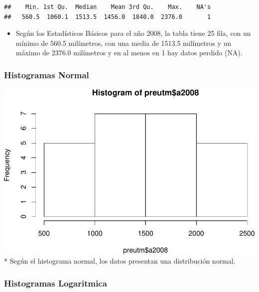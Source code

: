 \documentclass[11pt,]{article}
\newenvironment{Shaded}{\begin{snugshade}}{\end{snugshade}}
\newcommand{\KeywordTok}[1]{\textcolor[rgb]{0.13,0.29,0.53}{\textbf{#1}}}
\newcommand{\OperatorTok}[1]{\textcolor[rgb]{0.81,0.36,0.00}{\textbf{#1}}}
\newcommand{\NormalTok}[1]{#1}
\providecommand{\tightlist}{%
\setlength{\itemsep}{0pt}\setlength{\parskip}{0pt}}
\begin{document}
\begin{verbatim}
##    Min. 1st Qu.  Median    Mean 3rd Qu.    Max.    NA's 
##   560.5  1060.1  1513.5  1456.0  1840.0  2376.0       1
\end{verbatim}

\begin{itemize}
\tightlist
\item
  Según los Estadísticos Básicos para el año 2008, la tabla tiene 25
  fila, con un mínimo de 560.5 milímetros, con una media de 1513.5
  milímetros y un máximo de 2376.0 milímetros y en al menos en 1 hay
  datos perdido (NA).
\end{itemize}

\subsubsection{Histogramas Normal}\label{histogramas-normal-1}

\begin{Shaded}
\end{Shaded}

\includegraphics{proyecto_files/figure-latex/unnamed-chunk-25-1.pdf} *
Según el histograma normal, los datos presentan una distribución normal.

\subsubsection{Histogramas Logaritmica}\label{histogramas-logaritmica-1}

\begin{Shaded}
\end{Shaded}
\end{document}

